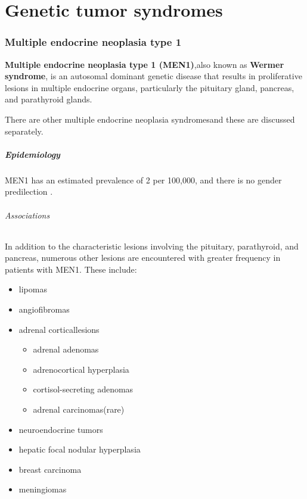 \chapter{Genetic tumor syndromes}

\subsection{Multiple endocrine neoplasia type 1}

\textbf{Multiple endocrine neoplasia type 1 (MEN1)},also known as \textbf{Wermer syndrome}, is an autosomal dominant genetic disease that results in proliferative lesions in multiple endocrine organs, particularly the pituitary gland, pancreas, and parathyroid glands.

There are other multiple endocrine neoplasia syndromesand these are discussed separately.

\paragraph{Epidemiology}

MEN1 has an estimated prevalence of 2 per 100,000, and there is no gender predilection .

\subparagraph{Associations}

In addition to the characteristic lesions involving the pituitary, parathyroid, and pancreas, numerous other lesions are encountered with greater frequency in patients with MEN1. These include:

\begin{itemize}
	\item
	lipomas
	\item
	angiofibromas
	\item
	adrenal corticallesions
	
	\begin{itemize}
		\item
		adrenal adenomas
		\item
		adrenocortical hyperplasia
		\item
		cortisol-secreting adenomas
		\item
		adrenal carcinomas(rare)
	\end{itemize}
	\item
	neuroendocrine tumors
	\item
	hepatic focal nodular hyperplasia
	\item
	breast carcinoma
	\item
	meningiomas
\end{itemize}


